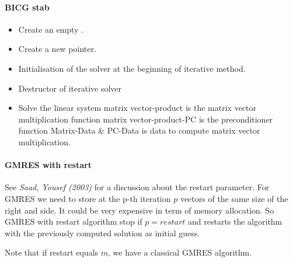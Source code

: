 \paragraph{BICG stab}
\begin{itemize}
  \item {}
    \sshortdescribe Create an empty .  
\item {}
  \sshortdescribe Create a new  pointer.  
\item {}
  \sshortdescribe Initialisation of the solver at the beginning of iterative method.  
\item {}
  \sshortdescribe Destructor of iterative solver  
\item {}
  \sshortdescribe Solve the linear system matrix vector-product is the matrix vector multiplication function matrix vector-product-PC is the preconditioner function Matrix-Data \& PC-Data is data to compute matrix vector multiplication.  
\end{itemize}

\paragraph{GMRES with restart} See {\em Saad, Yousef (2003)} for a discussion
about the restart parameter. For GMRES we need to store at the p-th iteration
$p$ vectors of the same size of the right and side. It could be very expensive
in term of memory allocation. So GMRES with restart algorithm stop if
$p=restart$ and restarts the algorithm with the previously computed solution
as initial guess.

Note that if restart equals $m$, we have a classical GMRES algorithm.

